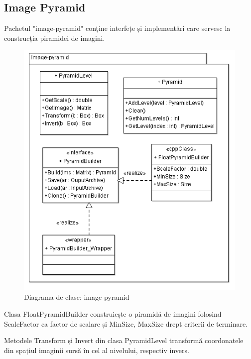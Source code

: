 \subsection{Image Pyramid}
Pachetul "image-pyramid" conține interfețe și implementări care servesc la construcția piramidei de imagini.
\begin{figure}[H]
	\centering
	\includegraphics[width=1.00\textwidth]{uml/imagepyramidClassDiagram.png}
	\caption{Diagrama de clase: image-pyramid}
	\label{fig:imagepyramidClassDiagram}
\end{figure}


Clasa FloatPyramidBuilder construiește o piramidă de imagini folosind ScaleFactor ca factor de scalare și MinSize, MaxSize drept criterii de terminare.

Metodele Transform și Invert din clasa PyramidLevel transformă coordonatele din spațiul imaginii sursă în cel al nivelului, respectiv invers.

